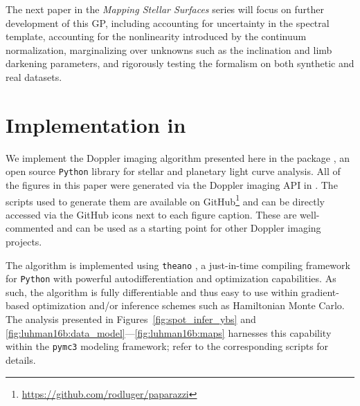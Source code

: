 \documentclass[modern]{aastex631}
\begin{document}
The next paper in the \emph{Mapping Stellar Surfaces} series will focus on further development of this GP, including accounting for uncertainty in the spectral template, accounting for the nonlinearity introduced by the continuum normalization, marginalizing over unknowns such as the inclination and limb darkening parameters, and rigorously testing the formalism on both synthetic and real datasets.

\section{Implementation in \starry}
\label{sec:starry}

We implement the Doppler imaging algorithm presented here in the \starry package \citep{Luger2019,Luger2021c}, an open source \texttt{Python} library for stellar and planetary light curve analysis. 
All of the figures in this paper were generated via the Doppler imaging API in \starry. 
The scripts used to generate them are available on GitHub\footnote{\url{https://github.com/rodluger/paparazzi}} and can be directly accessed via the GitHub icons next to each figure caption.
These are well-commented and can be used as a starting point for other Doppler imaging projects.

The algorithm is implemented using \texttt{theano} \citep{Bergstra2010}, a just-in-time compiling framework for \texttt{Python} with powerful autodifferentiation and optimization capabilities.
As such, the algorithm is fully differentiable and thus easy to use within gradient-based optimization and/or inference schemes such as Hamiltonian Monte Carlo.
The analysis presented in Figures~\ref{fig:spot_infer_ybs} and \ref{fig:luhman16b:data_model}---\ref{fig:luhman16b:maps} harnesses this capability within the \texttt{pymc3} modeling framework; refer to the corresponding scripts for details.
\end{document}
